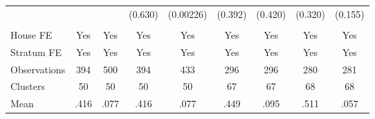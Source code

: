 {\begin{tabular}{l*{8}{c}}
                &         &         &  (0.630)&(0.00226)&  (0.392)&  (0.420)&  (0.320)&  (0.155)\\
                &         &         &         &         &         &         &         &         \\
House FE        &      Yes&      Yes&      Yes&      Yes&      Yes&      Yes&      Yes&      Yes\\
Stratum FE      &      Yes&      Yes&      Yes&      Yes&      Yes&      Yes&      Yes&      Yes\\
\midrule
Observations    &      394&      500&      394&      433&      296&      296&      280&      281\\
Clusters        &       50&       50&       50&       50&       67&       67&       68&       68\\
Mean            &     .416&     .077&     .416&     .077&     .449&     .095&     .511&     .057\\
\bottomrule
\end{tabular}
}

